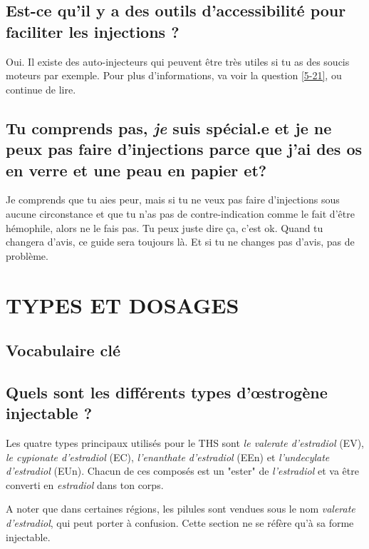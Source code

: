 \documentclass{article}
\begin{document}
\subsection{Est-ce qu'il y a des outils d'accessibilité pour faciliter les injections ?}

Oui. Il existe des auto-injecteurs qui peuvent être très utiles si tu as des soucis moteurs par exemple. Pour plus d'informations, va voir la question \ref{5-21}, ou continue de lire.

\subsection{Tu comprends pas, \textit{je} suis spécial.e et je ne peux pas faire d'injections parce que j'ai des os en verre et une peau en papier et\textemdash{}?}

Je comprends que tu aies peur, mais si tu ne veux pas faire d'injections sous aucune circonstance et que tu n'as pas de contre-indication comme le fait d'être hémophile, alors ne le fais pas. Tu peux juste dire ça, c'est ok. Quand tu changera d'avis, ce guide sera toujours là. Et si tu ne changes pas d'avis, pas de problème.
 

\section{TYPES ET DOSAGES}\label{td}

\subsection*{Vocabulaire clé}

\subsection{Quels sont les différents types d'œstrogène injectable ?}

Les quatre types principaux utilisés pour le THS sont \textit{le valerate d'estradiol} (EV), \textit{le cypionate d'estradiol} (EC), \textit{l'enanthate d'estradiol} (EEn) et \textit{l'undecylate d'estradiol} (EUn). Chacun de ces composés est un "ester" de \textit{l'estradiol} et va être converti en \textit{estradiol} dans ton corps.

A noter que dans certaines régions, les pilules sont vendues sous le nom \textit{valerate d'estradiol}, qui peut porter à confusion. Cette section ne se réfère qu'à sa forme injectable.
\end{document}

